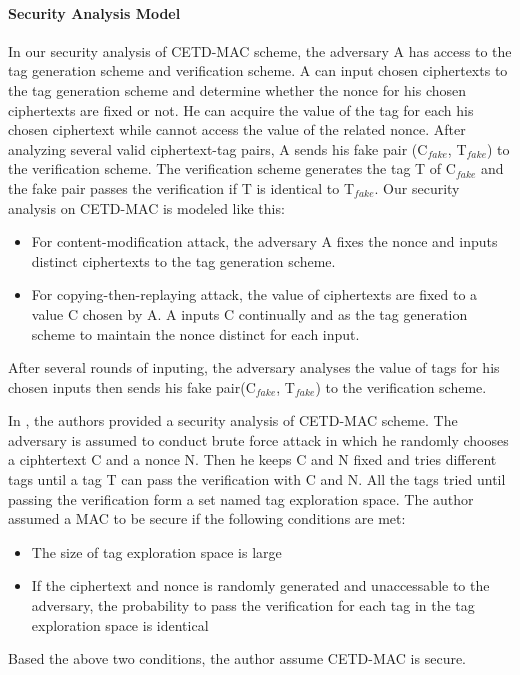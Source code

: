 \documentclass{article}
\begin{document}
\paragraph{Security Analysis Model}
In our security analysis of CETD-MAC scheme, the adversary A has access to the tag generation scheme and verification scheme. A can input chosen ciphertexts to the tag generation scheme and determine whether the nonce for his chosen ciphertexts are fixed or not. He can acquire the value of the tag for each his chosen ciphertext while cannot access the value of the related nonce. After analyzing several valid ciphertext-tag pairs, A sends his fake pair (C$_{fake}$, T$_{fake}$) to the verification scheme. The verification scheme generates the tag T of C$_{fake}$ and the fake pair passes the verification if T is identical to T$_{fake}$. Our security analysis on CETD-MAC is modeled like this:
\begin{itemize}
	\item For content-modification attack, the adversary A fixes the nonce and inputs distinct ciphertexts to the tag generation scheme. 	
	\item For copying-then-replaying attack, the value of ciphertexts are fixed to a value C chosen by A. A inputs C continually and as the tag generation scheme to maintain the nonce distinct for each input.    
\end{itemize}
After several rounds of inputing, the adversary analyses the value of tags for his chosen inputs then sends his fake pair(C$_{fake}$, T$_{fake}$) to the verification scheme.   	

In \cite{}, the authors provided a security analysis of CETD-MAC scheme. The adversary is assumed to conduct brute force attack in which he randomly chooses a ciphtertext C and a nonce N. Then he keeps C and N fixed and tries different tags until a tag T can pass the verification with C and N. All the tags tried until passing the verification form a set named tag exploration space. The author assumed a MAC to be secure if the following conditions are met:
\begin{itemize}
	\item The size of tag exploration space is large
	\item If the ciphertext and nonce is randomly generated and unaccessable to the adversary, the probability to pass the verification for each tag in the tag exploration space is identical
\end{itemize}
Based the above two conditions, the author assume CETD-MAC is secure.
\end{document}
